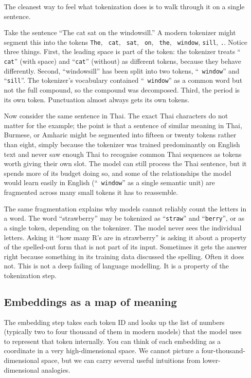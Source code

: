 The cleanest way to feel what tokenization does is to walk
through it on a single sentence.

Take the sentence ``The cat sat on the windowsill.'' A modern
tokenizer might segment this into the tokens \texttt{The},
\texttt{ cat}, \texttt{ sat}, \texttt{ on}, \texttt{ the},
\texttt{ window}, \texttt{sill}, \texttt{.}. Notice three
things. First, the leading space is part of the token: the
tokenizer treats ``\texttt{ cat}'' (with space) and
``\texttt{cat}'' (without) as different tokens, because they
behave differently. Second, ``windowsill'' has been split into
two tokens, ``\texttt{ window}'' and ``\texttt{sill}''. The
tokenizer's vocabulary contained ``\texttt{ window}'' as a
common word but not the full compound, so the compound was
decomposed. Third, the period is its own token. Punctuation
almost always gets its own tokens.

Now consider the same sentence in Thai. The exact Thai
characters do not matter for the example; the point is that a
sentence of similar meaning in Thai, Burmese, or Amharic might
be segmented into fifteen or twenty tokens rather than eight,
simply because the tokenizer was trained predominantly on
English text and never saw enough Thai to recognise common
Thai sequences as tokens worth giving their own slot. The
model can still process the Thai sentence, but it spends more
of its budget doing so, and some of the relationships the
model would learn easily in English
(``\texttt{ window}'' as a single semantic unit) are
fragmented across many small tokens it has to reassemble.

The same fragmentation explains why models cannot reliably count
the letters in a word. The word ``strawberry'' may be tokenized
as ``\texttt{straw}'' and ``\texttt{berry}'', or as a single
token, depending on the tokenizer. The model never sees the
individual letters. Asking it ``how many R's are in
strawberry'' is asking it about a property of the spelled-out
form that is not part of its input. Sometimes it gets the
answer right because something in its training data discussed
the spelling. Often it does not. This is not a deep failing of
language modelling. It is a property of the tokenization step.

\subsection*{Embeddings as a map of meaning}

The embedding step takes each token ID and looks up the list of
numbers (typically two to four thousand of them in modern
models) that the model uses to represent that token internally.
You can think of each embedding as a coordinate in a very
high-dimensional space. We cannot picture a four-thousand-
dimensional space, but we can carry several useful intuitions
from lower-dimensional analogies.


